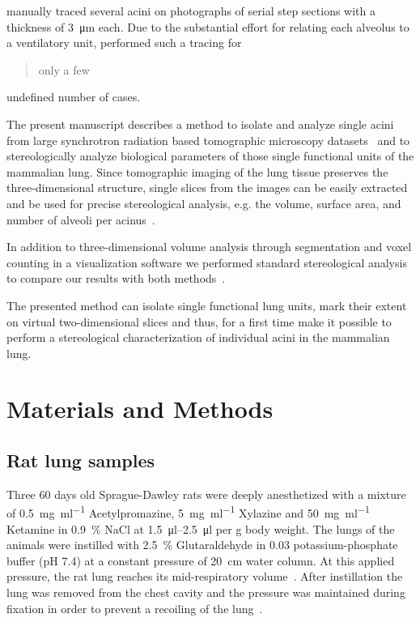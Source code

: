 \documentclass[a4paper,DIVcalc,abstract,english]{scrartcl}
\begin{document}
\citet{Mercer1987a} manually traced several acini on photographs of serial step sections with a thickness of \SI{3}{\micro\meter} each.
Due to the substantial effort for relating each alveolus to a ventilatory unit, \citeauthor{Mercer1987a} performed such a tracing for \blockquote{only a few} undefined number of cases.

The present manuscript describes a method to isolate and analyze single acini from large synchrotron radiation based tomographic microscopy datasets~\cite{Haberthuer2010a} and to stereologically analyze biological parameters of those single functional units of the mammalian lung.
Since tomographic imaging of the lung tissue preserves the three-dimensional structure, single slices from the images can be easily extracted and be used for precise stereological analysis, e.g. the volume, surface area, and number of alveoli per acinus~\cite{Hsia2010}.

In addition to three-dimensional volume analysis through segmentation and voxel counting in a visualization software we performed standard stereological analysis~\cite{Hsia2010} to compare our results with both methods~\cite{Rodriguez1987,Tschanz2003}.

The presented method can isolate single functional lung units, mark their extent on virtual two-dimensional slices and thus, for a first time make it possible to perform a stereological characterization of individual acini in the mammalian lung.

\section{Materials and Methods\label{sec:materials and methods}}
\subsection{Rat lung samples}
Three 60 days old Sprague-Dawley rats were deeply anesthetized with a mixture of %
\SI{0.5}{\milli\gram\per\milli\litre} Acetylpromazine, %
\SI{5}{\milli\gram\per\milli\litre} Xylazine and %
\SI{50}{\milli\gram\per\milli\litre} Ketamine in %
\SI{0.9}{\percent} NaCl at \SIrange{1.5}{2.5}{\micro\litre} per \si{\gram} body weight.
The lungs of the animals were instilled with \SI{2.5}{\percent} Glutaraldehyde in \SI{0.03}{\Molar} potassium-phosphate buffer (pH 7.4) at a constant pressure of \SI{20}{\centi\meter} water column.
At this applied pressure, the rat lung reaches its mid-respiratory volume~\cite{Schittny1998}.
After instillation the lung was removed from the chest cavity and the pressure was maintained during fixation in order to prevent a recoiling of the lung~\cite{Schittny2008}.
\end{document}
